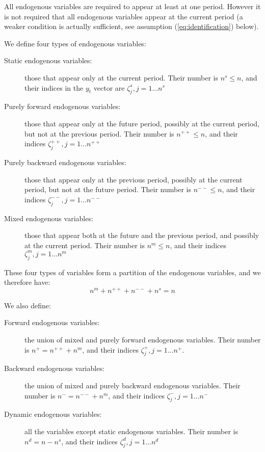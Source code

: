 \documentclass[11pt,a4paper]{article}
\begin{document}
All endogenous variables are required to appear at least at one period. However
it is not required that all endogenous variables appear at the current period
(a weaker condition is actually sufficient, see assumption
(\ref{eq:identification}) below).

We define four types of endogenous variables:
\begin{description}
\item[Static endogenous variables:] those that appear only at the current
  period. Their number is $n^s \leq n$, and their indices in the $y_t$ vector
  are $\zeta^s_j, j=1\ldots n^s$
\item[Purely forward endogenous variables:] those that appear only at the
  future period, possibly at the current period, but not at the previous
  period. Their number is $n^{++} \leq n$, and their indices $\zeta^{++}_j,
  j=1\ldots n^{++}$
\item[Purely backward endogenous variables:] those that appear only at the
  previous period, possibly at the current period, but not at the future
  period.  Their number is $n^{--} \leq n$, and their indices $\zeta^{--}_j,
  j=1\ldots n^{--}$
\item[Mixed endogenous variables:] those that appear both at the future and the
  previous period, and possibly at the current period.  Their number is $n^m
  \leq n$, and their indices $\zeta^m_j, j=1\ldots n^m$
\end{description}

These four types of variables form a partition of the endogenous variables, and
we therefore have:
\begin{equation*}
  n^m + n^{++} + n^{--} + n^s = n
\end{equation*}

We also define:
\begin{description}
\item[Forward endogenous variables:] the union of mixed and purely forward
  endogenous variables. Their number is $n^+ = n^{++} + n^m$, and their indices
  $\zeta^+_j, j=1\ldots n^+$.
\item[Backward endogenous variables:] the union of mixed and purely backward
  endogenous variables. Their number is $n^- = n^{--} + n^m$, and their indices
  $\zeta^-_j, j=1\ldots n^-$
\item[Dynamic endogenous variables:] all the variables except static endogenous
  variables. Their number is $n^d = n - n^s$, and their indices $\zeta^d_j,
  j=1\ldots n^d$
\end{description}
\end{document}
